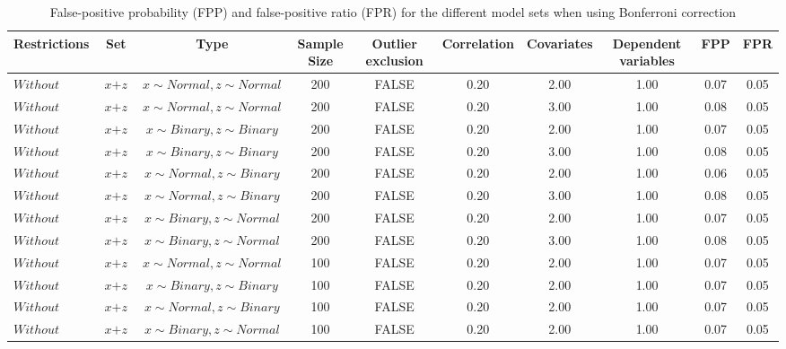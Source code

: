 \begin{longtable}{lccccccccc}
\caption{False-positive probability (FPP) and false-positive ratio (FPR) for the different model sets when using Bonferroni correction} \\ 
  \hline
Restrictions & Set & Type & Sample Size & Outlier exclusion & Correlation & Covariates & Dependent variables & FPP & FPR \\ 
  \hline
$Without$ & $\textit{x} + \textit{z}$ & $\textit{x} \sim Normal , \textit{z} \sim Normal$ & 200 & FALSE & 0.20 & 2.00 & 1.00 & 0.07 & 0.05 \\ 
  $Without$ & $\textit{x} + \textit{z}$ & $\textit{x} \sim Normal , \textit{z} \sim Normal$ & 200 & FALSE & 0.20 & 3.00 & 1.00 & 0.08 & 0.05 \\ 
  $Without$ & $\textit{x} + \textit{z}$ & $\textit{x} \sim Binary, \textit{z} \sim Binary$ & 200 & FALSE & 0.20 & 2.00 & 1.00 & 0.07 & 0.05 \\ 
  $Without$ & $\textit{x} + \textit{z}$ & $\textit{x} \sim Binary, \textit{z} \sim Binary$ & 200 & FALSE & 0.20 & 3.00 & 1.00 & 0.08 & 0.05 \\ 
  $Without$ & $\textit{x} + \textit{z}$ & $\textit{x} \sim Normal, \textit{z} \sim Binary$ & 200 & FALSE & 0.20 & 2.00 & 1.00 & 0.06 & 0.05 \\ 
  $Without$ & $\textit{x} + \textit{z}$ & $\textit{x} \sim Normal, \textit{z} \sim Binary$ & 200 & FALSE & 0.20 & 3.00 & 1.00 & 0.08 & 0.05 \\ 
  $Without$ & $\textit{x} + \textit{z}$ & $\textit{x} \sim Binary, \textit{z} \sim Normal$ & 200 & FALSE & 0.20 & 2.00 & 1.00 & 0.07 & 0.05 \\ 
  $Without$ & $\textit{x} + \textit{z}$ & $\textit{x} \sim Binary, \textit{z} \sim Normal$ & 200 & FALSE & 0.20 & 3.00 & 1.00 & 0.08 & 0.05 \\ 
  $Without$ & $\textit{x} + \textit{z}$ & $\textit{x} \sim Normal , \textit{z} \sim Normal$ & 100 & FALSE & 0.20 & 2.00 & 1.00 & 0.07 & 0.05 \\ 
  $Without$ & $\textit{x} + \textit{z}$ & $\textit{x} \sim Binary, \textit{z} \sim Binary$ & 100 & FALSE & 0.20 & 2.00 & 1.00 & 0.07 & 0.05 \\ 
  $Without$ & $\textit{x} + \textit{z}$ & $\textit{x} \sim Normal, \textit{z} \sim Binary$ & 100 & FALSE & 0.20 & 2.00 & 1.00 & 0.07 & 0.05 \\ 
  $Without$ & $\textit{x} + \textit{z}$ & $\textit{x} \sim Binary, \textit{z} \sim Normal$ & 100 & FALSE & 0.20 & 2.00 & 1.00 & 0.07 & 0.05 \\ 

\end{longtable}
